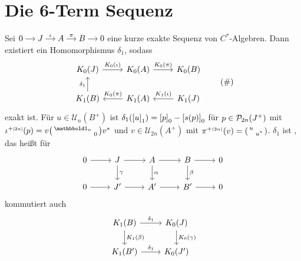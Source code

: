 \section{Die 6-Term Sequenz} %
\label{sec:9}

\begin{satz}[label=satz:91]
	Sei \(
		\begin{tikzcd}[cramped,sep=small]
			0 \rar & J \rar["\iota"] & A \rar["\pi"] & B \rar & 0
		\end{tikzcd}
	\) eine kurze exakte Sequenz von $C^*$-Algebren.
	Dann existiert ein Homomorphismus $\delta_1$, sodass
	\begin{equation}
		\begin{tikzcd}
			K_0(J) \rar["K_0(\iota)"] & K_0(A) \rar["K_0(\pi)"] & K_0(B)  \\
			K_1(B) \uar["\delta_1"] & K_1(A) \lar["K_0(\pi)"'] & K_1(J) \lar["K_1(\iota)"']
		\end{tikzcd} \label{eq:91}\tag{\#}
	\end{equation}
	exakt ist.
	Für $u \in \mathcal{U}_n(B^+)$ ist $\delta_1 \enbrace*{\benbrace*{u}_1} = \benbrace*{p}_0 - \benbrace*{s(p)}_0$ für $p \in \mathcal{P}\mkern-2mu_{2n}(J^+)$ mit $\iota^{+\ssbbrace{2n}}(p) = v \begin{psmallmatrix}
		\ind_n & \\
		& 0
	\end{psmallmatrix} v^*$ und $v \in \mathcal{U}_{2n}(A^+)$ mit $\pi^{+{\scriptscriptstyle(2n)}}(v) = \begin{psmallmatrix}
		u & \\
		& u^*
	\end{psmallmatrix}$.
	$\delta_1$ ist , das heißt für 
	\[
		\begin{tikzcd}
			0 \rar & J \rar \dar["\gamma"] & A \rar\dar["\alpha"] & B \rar \dar["\beta"] & 0 \\
			0 \rar & J' \rar & A' \rar & B' \rar & 0
		\end{tikzcd}
	\]
	kommutiert auch
	\[
		\begin{tikzcd}
			K_1(B) \dar["K_1(\beta)"] \rar["\delta_1"] & K_0(J)  \dar["K_0(\gamma)"] \\
			K_1(B') \rar["\delta_1"] & K_0(J')
		\end{tikzcd}
	\]
\end{satz}
